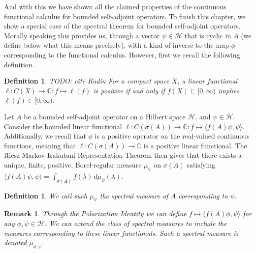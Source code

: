 \documentclass[12pt,oneside]{report}
\newtheorem{defn}[thm]{Definition}
\newtheorem{rem}[thm]{Remark}
\begin{document}
And with this we have shown all the claimed properties of the continuous functional calculus for bounded self-adjoint operators. To finish this chapter, we show a special case of the spectral theorem for bounded self-adjoint operators. Morally speaking this provides us, through a vector $\psi \in \mathscr{H}$ that is cyclic in $A$ (we define below what this means precisely), with a kind of inverse to the map $\phi$ corresponding to the functional calculus. However, first we recall the following definition.

\begin{defn}
    TODO: cite Rudin For a compact space $X$, a linear functional $\ell: C(X) \to \mathbb{C}: f \mapsto \ell(f)$ is positive if and only if $f(X) \subseteq [0,\infty)$ implies $\ell(f) \in [0, \infty)$.
\end{defn}


Let $A$ be a bounded self-adjoint operator on a Hilbert space $\mathscr{H}$, and $\psi \in \mathscr{H}$. Consider the bounded linear functional $\ell: C(\sigma(A)) \to \mathbb{C}: f \mapsto \langle f(A) \psi, \psi \rangle$. Additionally, we recall that $\phi$ is a positive operator on the real-valued continuous functions, meaning that $\ell: C(\sigma(A)) \to \mathbb{C}$ is a positive linear functional. The Riesz-Markov-Kakutani Representation Theorem then gives that there exists a unique, finite, positive, Borel-regular measure $\mu_{\psi}$ on $\sigma(A)$ satisfying $\langle f(A)\psi, \psi \rangle = \int _{\sigma(A)} f(\lambda) \, d\mu_{\psi}(\lambda)$. 


\begin{defn}
    We call such $\mu_{\psi}$ the spectral measure of $A$ corresponding to $\psi$.
\end{defn}

\begin{rem}\label{extended-spectral-measures}
    Through the Polarization Identity we can define $f \mapsto \langle f(A)\phi,\psi \rangle$  for any $\phi, \psi \in \mathscr{H}$. We can extend the class of spectral measures to include the measures corresponding to these linear functionals. Such a spectral measure is denoted $\mu_{\phi,\psi}$.
\end{rem}
\end{document}
